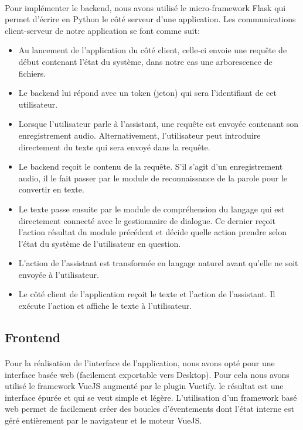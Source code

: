 \paragraph{}Pour implémenter le backend, nous avons utilisé le micro-framework Flask qui permet d'écrire en Python le côté serveur d'une application. Les communications client-serveur de notre application se font comme suit:
\begin{itemize}
	\item Au lancement de l'application du côté client, celle-ci envoie une requête de début contenant l'état du système, dans notre cas une arborescence de fichiers. 
	\item Le backend lui répond avec un token (jeton) qui sera l'identifiant de cet utilisateur.
	\item Lorsque l'utilisateur parle à l'assistant, une requête est envoyée contenant son enregistrement audio. Alternativement, l'utilisateur peut introduire directement du texte qui sera envoyé dans la requête.
	\item Le backend reçoit le contenu de la requête. S'il s'agit d'un enregistrement audio, il le fait passer par le module de reconnaissance de la parole pour le convertir en texte.
	\item Le texte passe ensuite par le module de compréhension du langage qui est directement connecté avec le gestionnaire de dialogue. Ce dernier reçoit l'action résultat du module précédent et décide quelle action prendre selon l'état du système de l'utilisateur en question.
	\item L'action de l'assistant est transformée en langage naturel avant qu'elle ne soit envoyée à l'utilisateur.
	\item Le côté client de l'application reçoit le texte et l'action de l'assistant. Il exécute l'action et affiche le texte à l'utilisateur.
\end{itemize}

\subsection{Frontend}
\paragraph{}
Pour la réalisation de l'interface de l'application, nous avons opté pour une interface basée web (facilement exportable vers Desktop). Pour cela nous avons utilisé le framework VueJS augmenté par le plugin Vuetify. le résultat est une interface épurée et qui se veut simple et légère. L'utilisation d'un framework basé web permet de facilement créer des boucles d'éventements dont l'état interne est géré entièrement par le navigateur et le moteur VueJS. 

